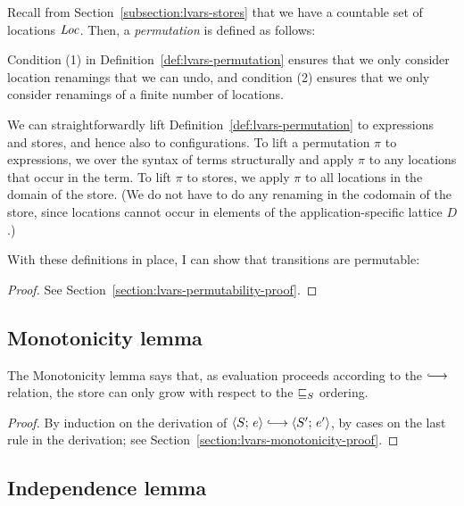 Recall from Section~\ref{subsection:lvars-stores} that we have a
countable set of locations $\mathit{Loc}$.  Then, a \emph{permutation} is
defined as follows:

\LVarsDefPermutation

Condition (1) in Definition~\ref{def:lvars-permutation} ensures that
we only consider location renamings that we can undo, and condition
(2) ensures that we only consider renamings of a finite number of
locations.

We can straightforwardly lift Definition~\ref{def:lvars-permutation}
to expressions and stores, and hence also to configurations.  To lift
a permutation $\pi$ to expressions, we over the syntax of terms
structurally and apply $\pi$ to any locations that occur in the term.
To lift $\pi$ to stores, we apply $\pi$ to all locations in the domain
of the store.  (We do not have to do any renaming in the codomain of
the store, since locations cannot occur in elements of the
application-specific lattice $D$.)

\LVarsDefPermutationExpression

\LVarsDefPermutationStore

\LVarsDefPermutationConfiguration

With these definitions in place, I can show that transitions are
permutable:

\LVarsLemPermutability
\begin{proof}
  See Section~\ref{section:lvars-permutability-proof}.
\end{proof}

\subsection{Monotonicity lemma}


The Monotonicity lemma says that, as evaluation proceeds according to
the $\parstepsto$ relation, the store can only grow with respect to
the $ \sqsubseteq_S $ ordering.

\LVarsLemMonotonicity
\begin{proof}
  By induction on the derivation of $\config{S}{e} \parstepsto
  \config{S'}{e'}$, by cases on the last rule in the derivation; see
  Section~\ref{section:lvars-monotonicity-proof}.
\end{proof}

\subsection{Independence lemma}\label{subsection:lvars-independence}

